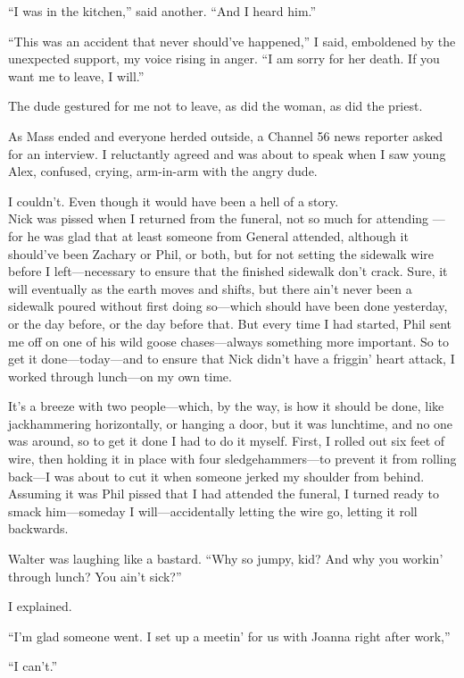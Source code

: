 ``I was in the kitchen,'' said another. ``And I heard him.''

``This was an accident that never should've happened,'' I said,
emboldened by the unexpected support, my voice rising in anger. ``I am
sorry for her death. If you want me to leave, I will.''

The dude gestured for me not to leave, as did the woman, as did the
priest.

As Mass ended and everyone herded outside, a Channel 56 news reporter
asked for an interview. I reluctantly agreed and was about to speak when
I saw young Alex, confused, crying, arm-in-arm with the angry dude.

I couldn't. Even though it would have been a hell of a story.\\

Nick was pissed when I returned from the funeral, not so much for
attending ---for he was glad that at least someone from General
attended, although it should've been Zachary or Phil, or both, but for
not setting the sidewalk wire before I left---necessary to ensure that
the finished sidewalk don't crack. Sure, it will eventually as the earth
moves and shifts, but there ain't never been a sidewalk poured without
first doing so---which should have been done yesterday, or the day
before, or the day before that. But every time I had started, Phil sent
me off on one of his wild goose chases---always something more
important. So to get it done---today---and to ensure that Nick didn't
have a friggin' heart attack, I worked through lunch---on my own time.

It's a breeze with two people---which, by the way, is how it should be
done, like jackhammering horizontally, or hanging a door, but it was
lunchtime, and no one was around, so to get it done I had to do it
myself. First, I rolled out six feet of wire, then holding it in place
with four sledgehammers---to prevent it from rolling back---I was about
to cut it when someone jerked my shoulder from behind. Assuming it was
Phil pissed that I had attended the funeral, I turned ready to smack
him---someday I will---accidentally letting the wire go, letting it roll
backwards.

Walter was laughing like a bastard. ``Why so jumpy, kid? And why you
workin' through lunch? You ain't sick?''

I explained.

``I'm glad someone went. I set up a meetin' for us with Joanna right
after work,''

``I can't.''

